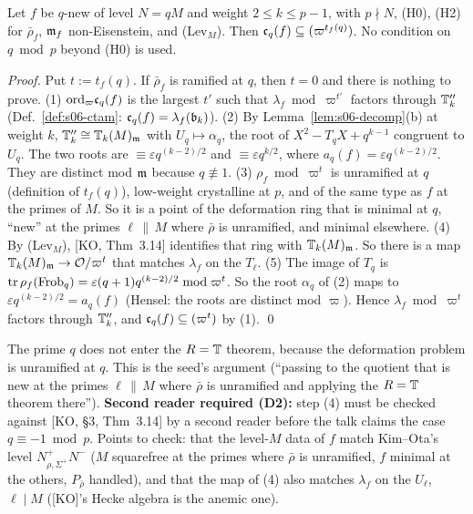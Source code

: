 \begin{proposition}\label{prop:s06-levM}
Let $f$ be $q$-new of level $N=qM$ and weight $2\le k\le p-1$, with $p\nmid N$, (H0), (H2) for $\bar\rho_f$, $\mathfrak{m}_f$ non-Eisenstein,
and (Lev$_M$). Then $\mathfrak{c}_q(f)\subseteq(\varpi^{t_f(q)})$. No condition on $q\bmod p$ beyond (H0) is used. \stpmc{}
\end{proposition}
\noindent\emph{Proof.} Put $t:=t_f(q)$. If $\bar\rho_f$ is ramified at $q$, then $t=0$ and there is nothing to prove.
(1) $\mathrm{ord}_\varpi\mathfrak{c}_q(f)$ is the largest $t'$ such that $\lambda_f\bmod\varpi^{t'}$ factors through $\mathbb{T}''_k$ (Def.~\ref{def:s06-ctam}:
$\mathfrak{c}_q(f)=\lambda_f(\mathfrak{b}_k)$).
(2) By Lemma~\ref{lem:s06-decomp}(b) at weight $k$, $\mathbb{T}''_k\cong\mathbb{T}_k(M)_{\mathfrak{m}}$ with $U_q\mapsto\alpha_q$, the root of
$X^2-T_qX+q^{k-1}$ congruent to $U_q$. The two roots are $\equiv\varepsilon q^{(k-2)/2}$ and $\equiv\varepsilon q^{k/2}$, where
$a_q(f)=\varepsilon q^{(k-2)/2}$. They are distinct mod $\mathfrak{m}$ because $q\not\equiv1$.
(3) $\rho_f\bmod\varpi^t$ is unramified at $q$ (definition of $t_f(q)$), low-weight crystalline at $p$, and of the same type as $f$
at the primes of $M$. So it is a point of the deformation ring that is minimal at $q$, ``new'' at the primes $\ell\,\|\,M$ where
$\bar\rho$ is unramified, and minimal elsewhere.
(4) By (Lev$_M$), [KO, Thm~3.14]  identifies that ring with $\mathbb{T}_k(M)_{\mathfrak{m}}$. So there is a map $\mathbb{T}_k(M)_{\mathfrak{m}}\to\mathcal{O}/\varpi^t$ that matches
$\lambda_f$ on the $T_\ell$.
(5) The image of $T_q$ is $\operatorname{tr}\rho_f(\mathrm{Frob}_q)=\varepsilon(q+1)q^{(k-2)/2}\bmod\varpi^t$. So the root $\alpha_q$ of (2) maps to
$\varepsilon q^{(k-2)/2}=a_q(f)$ (Hensel: the roots are distinct mod $\varpi$). Hence $\lambda_f\bmod\varpi^t$ factors through
$\mathbb{T}''_k$, and $\mathfrak{c}_q(f)\subseteq(\varpi^t)$ by (1). \qed

\noindent The prime $q$ does not enter the $R=\mathbb{T}$ theorem, because the deformation problem is unramified at $q$. This is the seed's
argument (``passing to the quotient that is new at the primes $\ell\,\|\,M$ where $\bar\rho$ is unramified and applying the $R=\mathbb{T}$
theorem there''). \textbf{Second reader required (D2):} step (4) must be checked against [KO, \S3, Thm~3.14] by a second reader before
the talk claims the case $q\equiv-1\bmod p$. Points to check: that the level-$M$ data of $f$ match Kim--Ota's level
$N^+_{\rho,\Sigma^+}N^-$ ($M$ squarefree at the primes where $\bar\rho$ is unramified, $f$ minimal at the others, $P_{\bar\rho}$ handled),
and that the map of (4) also matches $\lambda_f$ on the $U_\ell$, $\ell\mid M$ ([KO]'s Hecke algebra is the anemic one).

